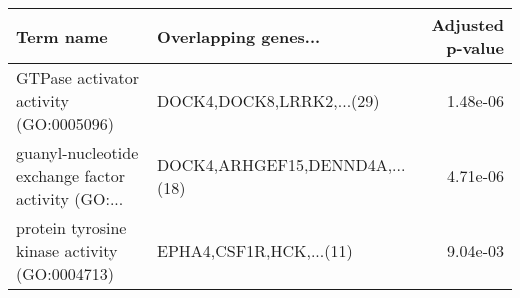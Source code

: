 \begin{tabular}{llr}
\toprule
                                         Term name &           Overlapping genes... &  Adjusted p-value \\
\midrule
            GTPase activator activity (GO:0005096) &      DOCK4,DOCK8,LRRK2,...(29) &          1.48e-06 \\
guanyl-nucleotide exchange factor activity (GO:... & DOCK4,ARHGEF15,DENND4A,...(18) &          4.71e-06 \\
     protein tyrosine kinase activity (GO:0004713) &        EPHA4,CSF1R,HCK,...(11) &          9.04e-03 \\
\bottomrule
\end{tabular}
